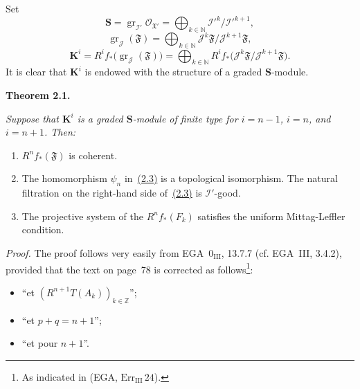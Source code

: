 Set
\begin{equation}
\tag{2.5}\label{eq:IX.2.5}
\mathbf S
  =\operatorname{gr}_{\mathcal I'}\mathcal O_{\mathfrak X'}
  =\bigoplus_{k\in\mathbb N}\mathcal I'^{k}/\mathcal I'^{k+1},
\end{equation}
\begin{equation}
\tag{2.6}\label{eq:IX.2.6}
\operatorname{gr}_{\mathcal J}(\mathfrak F)
  =\bigoplus_{k\in\mathbb N}
    \mathcal J^{k}\mathfrak F/\mathcal J^{k+1}\mathfrak F,
\end{equation}
\begin{equation}
\tag{2.7}\label{eq:IX.2.7}
\mathbf K^{i}
  =R^{i}f_*\bigl(\operatorname{gr}_{\mathcal J}(\mathfrak F)\bigr)
  =\bigoplus_{k\in\mathbb N}
    R^{i}f_*\bigl(\mathcal J^{k}\mathfrak F/
      \mathcal J^{k+1}\mathfrak F\bigr).
\end{equation}
It is clear that $\mathbf K^{i}$ is endowed with the structure of a graded
$\mathbf S$-module.

\medskip
\noindent\textbf{Theorem 2.1.}\quad
{\itshape Suppose that $\mathbf K^i$ is a graded $\mathbf S$-module of finite
type for $i=n-1$, $i=n$, and $i=n+1$. Then:
\begin{enumerate}
\renewcommand{\labelenumi}{(\roman{enumi})}
\setlength{\itemsep}{0.35em}
\item $R^n f_*(\mathfrak F)$ is coherent.
\item The homomorphism $\psi_n$ in~\hyperref[eq:IX.2.3]{(2.3)} is a topological isomorphism. The
natural filtration on the right-hand side of~\hyperref[eq:IX.2.3]{(2.3)} is $\mathcal I'$-good.
\item The projective system of the $R^n f_*(F_k)$ satisfies the uniform
Mittag-Leffler condition.
\end{enumerate}}

\medskip
\noindent\textit{Proof.}\quad
The proof follows very easily from EGA~$0_{\mathrm{III}}$, 13.7.7
(cf. EGA~III, 3.4.2), provided that the text on page~78 is corrected as
follows\footnote{As indicated in (EGA, $\mathrm{Err}_{\mathrm{III}}\,24$).}:
\begin{itemize}[leftmargin=6em,labelwidth=4.5em,align=left]
\item[\emph{delete}, line 6] ``et $(R^{n+1}T(A_k))_{k\in\mathbb Z}$'';
\item[line 13] ``et $p+q=n+1$'';
\item[line 23] ``et pour $n+1$''.
\end{itemize}

